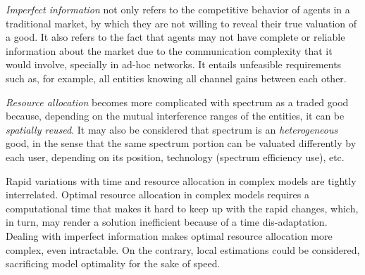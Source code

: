 \textit{Imperfect information} not only refers to the competitive behavior of agents in a traditional market, by which they are not willing to reveal their true valuation of a good. 
It also refers to the fact that agents may not have complete or reliable information about the market due to the communication complexity that it would involve, specially in ad-hoc networks. 
It entails unfeasible requirements such as, for example, all entities knowing all channel gains between each other.

\textit{Resource allocation} becomes more complicated with spectrum as a traded good because, depending on the mutual interference ranges of the entities, it can be \textit{spatially reused}. 
It may also be considered that spectrum is an \textit{heterogeneous} good, in the sense that the same spectrum portion can be valuated differently by each user, depending on its position, technology (spectrum efficiency use), etc. 

Rapid variations with time and resource allocation in complex models are tightly interrelated.
Optimal resource allocation in complex models requires a computational time that makes it hard to keep up with the rapid changes, which, in turn, may render a solution inefficient because of a time dis-adaptation. 
Dealing with imperfect information makes optimal resource allocation more complex, even intractable. On the contrary, local estimations could be considered, sacrificing model optimality for the sake of speed.


